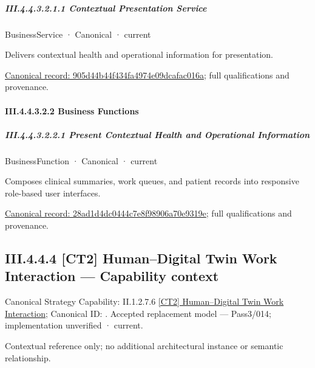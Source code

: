\subparagraph*{III.4.4.3.2.1.1 Contextual Presentation Service}
\label{navigation:III.4.4.3.2.1.1}

\label{element:905d44b44f434fa4974e09dcafac016a}
{\small BusinessService · Canonical · current}\par

Delivers contextual health and operational information for presentation.


{\footnotesize \href{../../../../../../../continuum/business/business-service/905d44b44f434fa4974e09dcafac016a.md}{Canonical record: 905d44b44f434fa4974e09dcafac016a}; full qualifications and provenance.}\par
\paragraph*{III.4.4.3.2.2 Business Functions}
\label{navigation:III.4.4.3.2.2}

\subparagraph*{III.4.4.3.2.2.1 Present Contextual Health and Operational Information}
\label{navigation:III.4.4.3.2.2.1}

\label{element:28ad1d4dc0444c7e8f98906a70e9319e}
{\small BusinessFunction · Canonical · current}\par

Composes clinical summaries, work queues, and patient records into responsive role-based user interfaces.


{\footnotesize \href{../../../../../../../continuum/business/business-function/28ad1d4dc0444c7e8f98906a70e9319e.md}{Canonical record: 28ad1d4dc0444c7e8f98906a70e9319e}; full qualifications and provenance.}\par
\subsection*{III.4.4.4 [CT2] Human–Digital Twin Work Interaction — Capability context}
\label{navigation:III.4.4.4}

{\small Canonical Strategy Capability: II.1.2.7.6 \hyperref[element:8bcaa906b67443019e75ffd13af64c9c]{[CT2] Human–Digital Twin Work Interaction}; Canonical ID: \texttt{}. Accepted replacement model — Pass3/014; implementation unverified · current.}\par
Contextual reference only; no additional architectural instance or semantic relationship.\par
